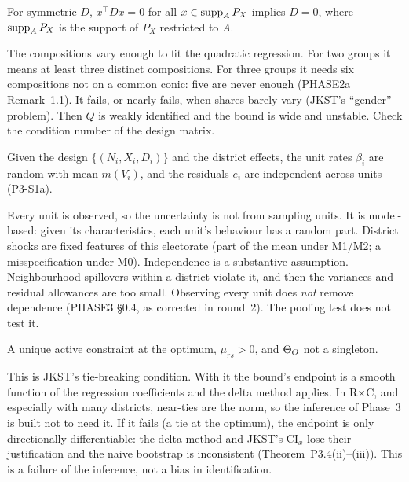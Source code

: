 \begin{assumption}
For symmetric $D$, $x^\top Dx=0$ for all $x\in\operatorname{supp}_AP_X$ implies $D=0$, where
$\operatorname{supp}_AP_X$ is the support of $P_X$ restricted to $A$.
\end{assumption}
\begin{plain}
The compositions vary enough to fit the quadratic regression. For two groups it
means at least three distinct compositions. For three groups it needs six
compositions not on a common conic: five are never enough (PHASE2a
Remark~1.1). It fails, or nearly fails, when shares barely vary (JKST's
``gender'' problem). Then $Q$ is weakly identified and the bound is wide and
unstable. Check the condition number of the design matrix.
\end{plain}

\begin{assumption}
Given the design $\{(N_i,X_i,D_i)\}$ and the district effects, the unit rates
$\beta_i$ are random with mean $m(V_i)$, and the residuals $e_i$ are
independent across units (P3-S1a).
\end{assumption}
\begin{plain}
Every unit is observed, so the uncertainty is not from sampling units. It is
model-based: given its characteristics, each unit's behaviour has a random part.
District shocks are fixed features of this electorate (part of the mean under
M1/M2; a misspecification under M0). Independence is a substantive assumption.
Neighbourhood spillovers within a district violate it, and then the variances
and residual allowances are too small. Observing every unit does \emph{not}
remove dependence (PHASE3 \S0.4, as corrected in round~2). The pooling test
does not test it.
\end{plain}

\begin{assumption}
A unique active constraint at the optimum, $\mu_{rs}>0$, and $\Theta_O$ not a
singleton.
\end{assumption}
\begin{plain}
This is JKST's tie-breaking condition. With it the bound's endpoint is a smooth
function of the regression coefficients and the delta method applies. In
R$\times$C, and especially with many districts, near-ties are the norm, so the
inference of Phase~3 is built not to need it. If it fails (a tie at the optimum),
the endpoint is only directionally differentiable: the delta method and JKST's
$\mathrm{CI}_x$ lose their justification and the naive bootstrap is inconsistent
(Theorem~P3.4(ii)--(iii)). This is a failure of the inference, not a bias in
identification.
\end{plain}

